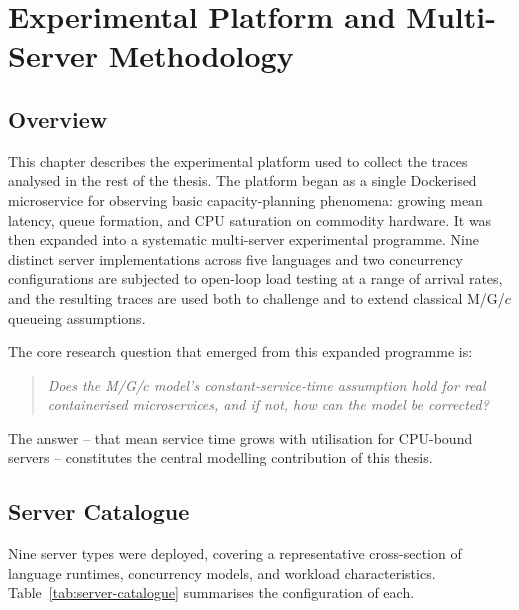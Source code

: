 ﻿\chapter{Experimental Platform and Multi-Server Methodology}
\label{ch:methodology_b}

\section{Overview}

This chapter describes the experimental platform used to collect the traces analysed in the rest of the thesis. The platform began as a single Dockerised microservice for observing basic capacity-planning phenomena: growing mean latency, queue formation, and CPU saturation on commodity hardware. It was then expanded into a systematic multi-server experimental programme. Nine distinct server implementations across five languages and two concurrency configurations are subjected to open-loop load testing at a range of arrival rates, and the resulting traces are used both to challenge and to extend classical M/G/$c$ queueing assumptions.

The core research question that emerged from this expanded programme is:

\begin{quote}
\emph{Does the M/G/$c$ model's constant-service-time assumption hold for real containerised microservices, and if not, how can the model be corrected?}
\end{quote}

The answer -- that mean service time grows with utilisation for CPU-bound servers -- constitutes the central modelling contribution of this thesis.

\section{Server Catalogue}
\label{sec:server-catalogue}

Nine server types were deployed, covering a representative cross-section of language runtimes, concurrency models, and workload characteristics. Table~\ref{tab:server-catalogue} summarises the configuration of each.

